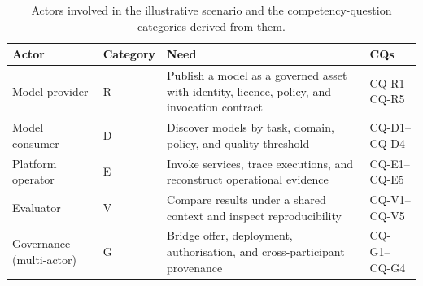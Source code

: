 \documentclass[11pt,a4paper]{article}
\newcommand{\cq}[1]{\textsf{#1}}
\begin{document}
\begin{table}[t]
\small\sf\centering
\caption{Actors involved in the illustrative scenario and the competency-question categories derived from them.\label{tab:actors}}
\begin{tabular}{@{}p{3.5cm}p{2cm}p{7cm}p{2.5cm}@{}}
\toprule
\textbf{Actor} & \textbf{Category} & \textbf{Need} & \textbf{CQs} \\
\midrule
Model provider & R & Publish a model as a governed asset with identity, licence, policy, and invocation contract & \cq{CQ-R1}--\cq{CQ-R5} \\
Model consumer & D & Discover models by task, domain, policy, and quality threshold & \cq{CQ-D1}--\cq{CQ-D4} \\
Platform operator & E & Invoke services, trace executions, and reconstruct operational evidence & \cq{CQ-E1}--\cq{CQ-E5} \\
Evaluator & V & Compare results under a shared context and inspect reproducibility & \cq{CQ-V1}--\cq{CQ-V5} \\
Governance (multi-actor) & G & Bridge offer, deployment, authorisation, and cross-participant provenance & \cq{CQ-G1}--\cq{CQ-G4} \\
\bottomrule
\end{tabular}
\end{table}
\end{document}
